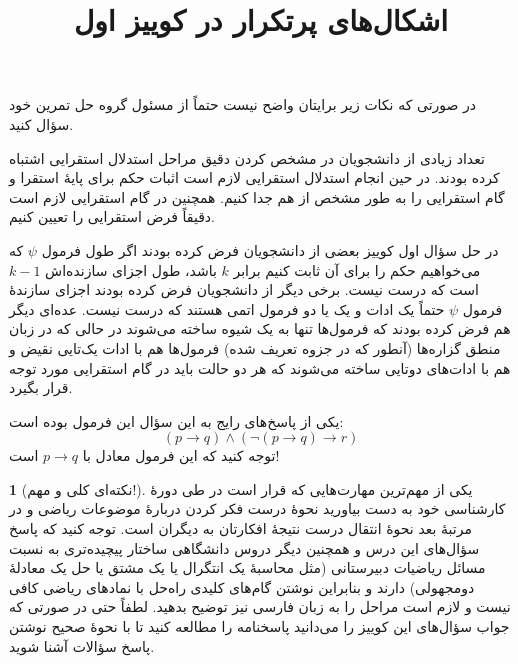 \documentclass[12pt]{article}
\theoremstyle{definition}
\theoremstyle{named}
\newtheorem*{namedtheorem}{}
\begin{document}
\title{اشکال‌های پرتکرار در کوییز اول}
\author{}
\date{}

\maketitle

\vspace{-2.5cm}

\vspace{0.5cm}
\noindent
در صورتی که نکات زیر برایتان واضح نیست حتماً از مسئول گروه حل تمرین خود سؤال کنید.

\exc
تعداد زیادی از دانشجویان در مشخص کردن دقیق مراحل استدلال استقرایی اشتباه کرده بودند. در حین انجام استدلال استقرایی لازم است اثبات حکم برای پایهٔ استقرا و گام استقرایی را به طور مشخص از هم جدا کنیم. همچنین در گام استقرایی لازم است دقیقاً فرض استقرایی را تعیین کنیم.


در حل سؤال اول کوییز بعضی از دانشجویان فرض کرده بودند اگر طول فرمول $\psi$
که می‌خواهیم حکم را برای آن ثابت کنیم برابر
$k$
باشد، طول اجزای سازنده‌اش
$k-1$
است که درست نیست. برخی دیگر از دانشجویان فرض کرده بودند اجزای سازندهٔ فرمول
$\psi$
حتماً یک ادات و یک یا دو فرمول اتمی هستند که درست نیست. عده‌ای دیگر هم فرض کرده بودند که فرمول‌ها تنها به یک شیوه ساخته می‌شوند در حالی که در زبان منطق گزاره‌ها (آنطور که در جزوه تعریف شده)
فرمول‌ها هم با ادات یک‌تایی نقیض و هم با ادات‌های دوتایی ساخته می‌شوند که هر دو حالت باید در گام استقرایی مورد توجه قرار بگیرد. 

\exc
یکی از پاسخ‌های رایج به این سؤال این فرمول بوده است:
$$(p\to q)\wedge(\neg(p\to q)\to r)$$
توجه کنید که این فرمول معادل با
$p\to q$
است!

\begin{namedtheorem}[نکته‌ای کلی و مهم!]
    یکی از مهم‌ترین مهارت‌هایی که قرار است در طی دورهٔ کارشناسی خود به دست بیاورید نحوهٔ درست فکر کردن دربارهٔ موضوعات ریاضی و در مرتبهٔ بعد نحوهٔ انتقال درست نتیجهٔ افکارتان به دیگران است. توجه کنید که پاسخ سؤال‌های این درس و همچنین دیگر دروس دانشگاهی ساختار پیچیده‌تری به نسبت مسائل ریاضیات دبیرستانی
    (مثل محاسبهٔ یک انتگرال یا یک مشتق یا حل یک معادلهٔ دومجهولی)
    دارند و بنابراین نوشتن گام‌های کلیدی راه‌حل با نمادهای ریاضی کافی نیست و لازم است مراحل را به زبان فارسی نیز توضیح بدهید. لطفاً حتی در صورتی که جواب سؤال‌های این کوییز را می‌دانید پاسخنامه را مطالعه کنید تا با نحوهٔ صحیح نوشتن پاسخ سؤالات آشنا شوید.
\end{namedtheorem}
\end{document}
